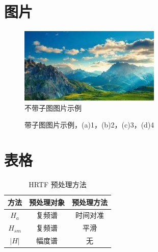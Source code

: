\section{图片}
\begin{figure}[h]
	\centering
	\includegraphics[width=0.6\textwidth]{figure/chapter1/Omni.jpg}
	\caption{不带子图图片示例 }
	\label{fig:Fishon_2D}
\end{figure}
\begin{figure}[htbp]
\centering
{}
\hfill
{}
\hfill
{}
\hfill
{}
\caption{带子图图片示例，(a)1，(b)2，(c)3，(d)4}
\label{fig:binaural_recording}
\end{figure}
\section{表格}
\begin{table}[H]
\caption{HRTF 预处理方法}
\centering
\begin{tabular}{|c|c|c|}
\hline
方法 & 预处理对象 & 预处理方法 \\
\hline
$H_{a}$ & 复频谱 & 时间对准 \\
$H_{s m}$ & 复频谱 & 平滑 \\
$|H|$ & 幅度谱 & 无 \\

\hline
\end{tabular}
\label{tab.pre_processing}
\end{table}

